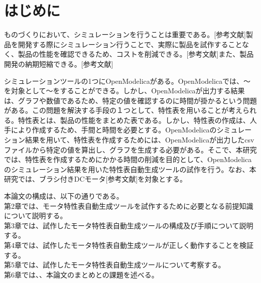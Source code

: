 \chapter{はじめに}\label{cha:Introduction}


ものづくりにおいて、シミュレーションを行うことは重要である。[参考文献]製品を開発する際にシミュレーション行うことで、実際に製品を試作することなく、製品の性能を確認できるため、コストを削減できる。[参考文献]また、製品開発の納期短縮できる。[参考文献]

シミュレーションツールの1つにOpenModelicaがある。OpenModelicaでは、～を対象として～をすることができる。しかし、OpenModelicaが出力する結果は、グラフや数値であるため、特定の値を確認するのに時間が掛かるという問題がある。この問題を解決する手段の１つとして、特性表を用いることが考えられる。特性表とは、製品の性能をまとめた表である。しかし、特性表の作成は、人手により作成するため、手間と時間を必要とする。OpenModelicaのシミュレーション結果を用いて、特性表を作成するためには、OpenModelicaが出力したcsvファイルから特定の値を算出し、グラフを生成する必要がある。そこで、本研究では、特性表を作成するためにかかる時間の削減を目的として、OpenModelicaのシミュレーション結果を用いた特性表自動生成ツールの試作を行う。なお、本研究では、ブラシ付きDCモータ[参考文献]を対象とする。

本論文の構成は、以下の通りである。\\
第2章では、モータ特性表自動生成ツールを試作するために必要となる前提知識について説明する。\\
第3章では、試作したモータ特性表自動生成ツールの構成及び手順について説明する。\\
第4章では、試作したモータ特性表自動生成ツールが正しく動作することを検証する。\\
第5章では、試作したモータ特性表自動生成ツールについて考察する。\\
第6章では、、本論文のまとめとの課題を述べる。\\